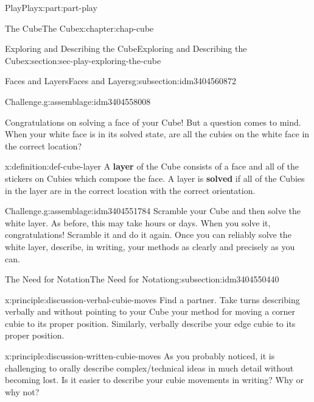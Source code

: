 \documentclass[oneside,10pt,]{book}
\newcommand{\terminology}[1]{\textbf{#1}}
\numberwithin{equation}{section}
\begin{document}
\begin{partptx}{Play}{}{Play}{}{}{x:part:part-play}
\begin{chapterptx}{The Cube}{}{The Cube}{}{}{x:chapter:chap-cube}
\begin{sectionptx}{Exploring and Describing the Cube}{}{Exploring and Describing the Cube}{}{}{x:section:sec-play-exploring-the-cube}
\begin{subsectionptx}{Faces and Layers}{}{Faces and Layers}{}{}{g:subsection:idm3404560872}
\begin{assemblage}{Challenge.}{g:assemblage:idm3404558008}
\end{assemblage}
Congratulations on solving a face of your Cube! But a question comes to mind. When your white face is in its solved state, are all the cubies on the white face in the correct location?%
\begin{definition}{}{x:definition:def-cube-layer}%
%
A \terminology{layer} of the Cube consists of a face and all of the stickers on Cubies which compose the face. A layer is \terminology{solved} if all of the Cubies in the layer are in the correct location with the correct orientation.%
\end{definition}
\begin{assemblage}{Challenge.}{g:assemblage:idm3404551784}%
Scramble your Cube and then solve the white layer. As before, this may take hours or days. When you solve it, congratulations! Scramble it and do it again. Once you can reliably solve the white layer, describe, in writing, your methods as clearly and precisely as you can.%
\end{assemblage}
\end{subsectionptx}
%
%
\typeout{************************************************}
\typeout{************************************************}
%
\begin{subsectionptx}{The Need for Notation}{}{The Need for Notation}{}{}{g:subsection:idm3404550440}
\begin{principle}{}{}{x:principle:discussion-verbal-cubie-moves}%
Find a partner. Take turns describing verbally and without pointing to your Cube your method for moving a corner cubie to its proper position. Similarly, verbally describe your edge cubie to its proper position.%
\end{principle}
\begin{principle}{}{}{x:principle:discussion-written-cubie-moves}%
As you probably noticed, it is challenging to orally describe complex\slash{}technical ideas in much detail without becoming lost. Is it easier to describe your cubie movements in writing? Why or why not?%
\end{principle}

\end{subsectionptx}
\end{sectionptx}
\end{chapterptx}
\end{partptx}
\end{document}

